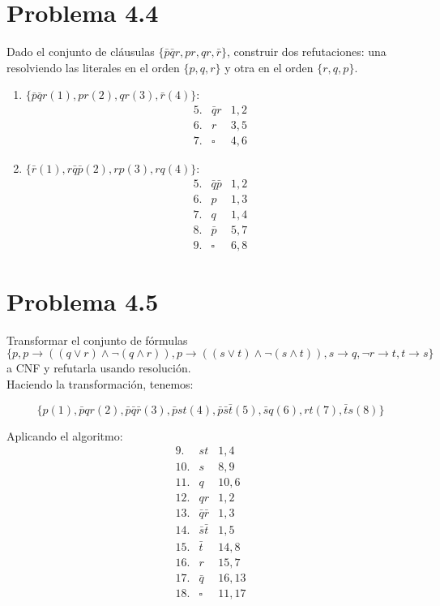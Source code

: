 \documentclass[letterpaper,12pt]{article}
\theoremstyle{definition}
\begin{document}
\section*{Problema 4.4}

Dado el conjunto de cláusulas \(\{\bar{p}\bar{q}r, pr, qr, \bar{r} \}\), construir dos refutaciones: una resolviendo las literales en el orden \(\{p, q, r\}\) y otra en el orden \(\{r, q, p\}\).\\

\begin{enumerate}
  \item \(\{\bar{p}\bar{q}r (1), pr (2), qr (3), \bar{r} (4) \}\):
    \begin{align*}
      5. & \bar{q}r & 1,2\\
      6. & r & 3,5\\
      7. & \square & 4,6 
    \end{align*}
  \item \(\{\bar{r} (1), r\bar{q}\bar{p} (2), rp (3), rq(4)\}\):
  \begin{align*}
    5. & \bar{q}\bar{p} & 1,2\\
    6. & p & 1,3\\
    7. & q & 1,4\\
    8. & \bar{p} & 5,7\\
    9. & \square & 6,8
  \end{align*}
\end{enumerate}



\section*{Problema 4.5}

Transformar el conjunto de fórmulas \(\{p, p \rightarrow ((q \lor r)\land \neg(q \land r)), p \rightarrow ((s \lor t) \land \neg (s \land t)), s \rightarrow q, \neg r \rightarrow t, t \rightarrow s  \}\) a CNF y refutarla usando resolución.\\ 

Haciendo la transformación, tenemos:

\begin{equation*}
  \{p(1), \bar{p}qr(2), \bar{p}\bar{q}\bar{r}(3), \bar{p}st(4), \bar{p}\bar{s}\bar{t}(5), \bar{s}q(6), rt(7), \bar{t}s(8) \}
\end{equation*}

Aplicando el algoritmo:\\

\begin{align*}
   9. & st & 1,4\\
   10. & s & 8,9 \\
   11. & q & 10,6\\
   12. & qr & 1,2\\
   13. & \bar{q}\bar{r} & 1,3\\
   14. & \bar{s}\bar{t} & 1,5\\
   15. & \bar{t} & 14,8\\
   16. & r & 15,7\\
   17. & \bar{q} & 16,13\\
   18. & \square & 11,17
\end{align*}
\end{document}
